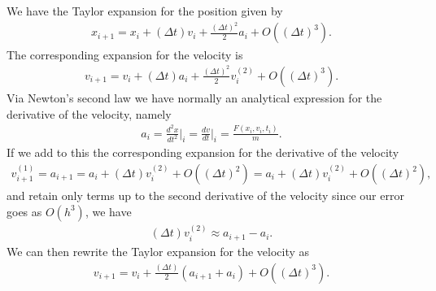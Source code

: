 \documentclass[letterpaper,10pt,english]{sphinxmanual}
\begin{document}
We have the Taylor expansion for the position given by
\begin{equation*}
\begin{split}
x_{i+1} = x_i+(\Delta t)v_i+\frac{(\Delta t)^2}{2}a_i+O((\Delta t)^3).
\end{split}
\end{equation*}
The corresponding expansion for the velocity is
\begin{equation*}
\begin{split}
v_{i+1} = v_i+(\Delta t)a_i+\frac{(\Delta t)^2}{2}v^{(2)}_i+O((\Delta t)^3).
\end{split}
\end{equation*}
Via Newton’s second law we have normally an analytical expression for the derivative of the velocity, namely
\begin{equation*}
\begin{split}
a_i= \frac{d^2 x}{dt^2}\vert_{i}=\frac{d v}{dt}\vert_{i}= \frac{F(x_i,v_i,t_i)}{m}.
\end{split}
\end{equation*}
If we add to this the corresponding expansion for the derivative of the velocity
\begin{equation*}
\begin{split}
v^{(1)}_{i+1} = a_{i+1}= a_i+(\Delta t)v^{(2)}_i+O((\Delta t)^2)=a_i+(\Delta t)v^{(2)}_i+O((\Delta t)^2),
\end{split}
\end{equation*}
and retain only terms up to the second derivative of the velocity since our error goes as \(O(h^3)\), we have
\begin{equation*}
\begin{split}
(\Delta t)v^{(2)}_i\approx a_{i+1}-a_i.
\end{split}
\end{equation*}
We can then rewrite the Taylor expansion for the velocity as
\begin{equation*}
\begin{split}
v_{i+1} = v_i+\frac{(\Delta t)}{2}\left( a_{i+1}+a_{i}\right)+O((\Delta t)^3).
\end{split}
\end{equation*}
\end{document}
